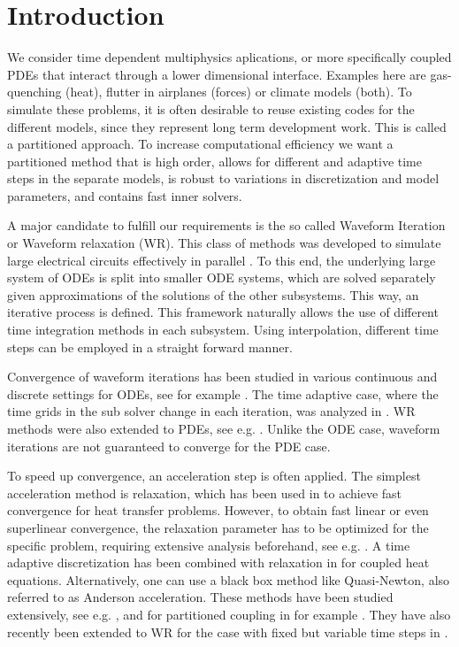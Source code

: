 \section{Introduction}

We consider time dependent multiphysics aplications, or more specifically coupled PDEs that interact through a lower dimensional interface. Examples here are gas-quenching (heat), flutter in airplanes (forces) or climate models (both). To simulate these problems, it is often desirable to reuse existing codes for the different models, since they represent long term development work. This is called a partitioned approach. To increase computational efficiency we want a partitioned method that is high order, allows for different and adaptive time steps in the separate models, is robust to variations in discretization and model parameters, and contains fast inner solvers.

A major candidate to fulfill our requirements is the so called Waveform Iteration or Waveform relaxation (WR). This class of methods was developed to simulate large electrical circuits effectively in parallel \cite{WhSa86}. To this end, the underlying large system of ODEs is split into smaller ODE systems, which are solved separately given approximations of the solutions of the other subsystems. This way, an iterative process is defined. This framework naturally allows the use of different time integration methods in each subsystem. Using interpolation, different time steps can be employed in a straight forward manner. 

Convergence of waveform iterations has been studied in various continuous and discrete settings for ODEs, see for example \cite{Ne89Cont, Ne89Disc, WhSa86}. The time adaptive case, where the time grids in the sub solver change in each iteration, was analyzed in \cite{BeZe93}. WR methods were also extended to PDEs, see e.g. \cite{JaVa96a, JaVa96b,gakwma:16, BiMo19}. Unlike the ODE case, waveform iterations are not guaranteed to converge for the PDE case. 

To speed up convergence, an acceleration step is often applied. The simplest acceleration method is relaxation, which has been used in \cite{BiMo18} to achieve fast convergence for heat transfer problems. However, to obtain fast linear or even superlinear convergence, the relaxation parameter has to be optimized for the specific problem, requiring extensive analysis beforehand, see e.g. \cite{BiMo19}. A time adaptive discretization has been combined with relaxation in \cite{BiMeMo23} for coupled heat equations. Alternatively, one can use a black box method like Quasi-Newton, also referred to as Anderson acceleration. These methods have been studied extensively, see e.g. \cite{polreb:21}, and for partitioned coupling in for example \cite{HaDe10, SchUe15, SchMe17}. They have also recently been extended to WR for the case with fixed but variable time steps in \cite{RuUe21}. 

